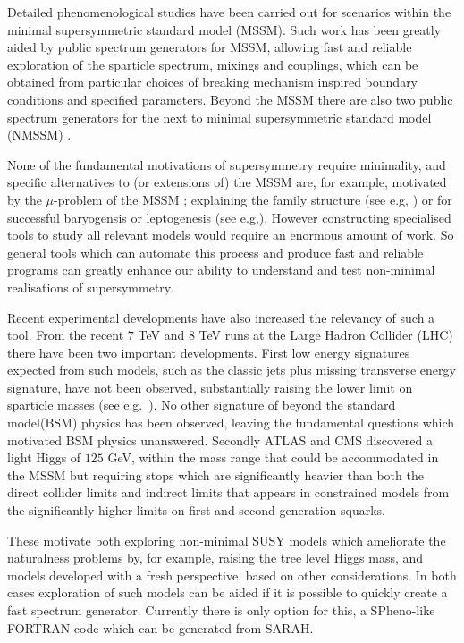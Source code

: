 \documentclass[final,3p,11pt,pdflatex]{elsarticle}
\newcommand{\sarah}{SARAH\xspace}
\begin{document}
Detailed phenomenological studies have been carried out for scenarios
within the minimal supersymmetric standard model (MSSM).  Such work
has been greatly aided by public spectrum generators for
MSSM\cite{Allanach:2001kg,Porod:2003um,Djouadi:2002ze,Baer:1993ae},
allowing fast and reliable exploration of the sparticle spectrum,
mixings and couplings, which can be obtained from particular choices
of breaking mechanism inspired boundary conditions and specified
parameters. Beyond the MSSM there are also two public spectrum
generators \cite{Ellwanger:2006rn,Allanach:2013kza} for the next to
minimal supersymmetric standard model (NMSSM) \cite{NMSSM}.

None of the fundamental motivations of supersymmetry require
minimality, and specific alternatives to (or extensions of) the MSSM
are, for example, motivated by the $\mu$-problem of the
MSSM \cite{Kim:1983dt}; explaining the family structure (see e.g,
\cite{King:2014nza}) or for successful baryogensis or leptogenesis
(see e.g,\cite{King:2008qb}). However constructing specialised tools
to study all relevant models would require an enormous amount of work.
So general tools which can automate this process and produce fast and
reliable programs can greatly enhance our ability to understand and
test non-minimal realisations of supersymmetry.

Recent experimental developments have also increased the relevancy of
such a tool. From the recent $7$ TeV and $8$ TeV runs at the Large
Hadron Collider (LHC) there have been two important developments.
First low energy signatures expected from such models, such as the
classic jets plus missing transverse energy signature, have not been
observed, substantially raising the lower limit on sparticle masses
(see e.g.~\cite{Aad:2013wta,Chatrchyan:2014lfa}). No other signature
of beyond the standard model(BSM) physics has been observed, leaving
the fundamental questions which motivated BSM physics
unanswered. Secondly ATLAS and CMS discovered\cite{ATLAS:2012ae,
  Chatrchyan:2012tx} a light Higgs of $125$ GeV, within the mass range
that could be accommodated in the MSSM but requiring stops which are
significantly heavier than both the direct collider limits and
indirect limits that appears in constrained models from the
significantly higher limits on first and second generation squarks.

These motivate both exploring non-minimal SUSY models which ameliorate
the naturalness problems by, for example, raising the tree level Higgs
mass, and models developed with a fresh perspective, based on other
considerations.  In both cases exploration of such models can be aided
if it is possible to quickly create a fast spectrum generator.
Currently there is only option for this, a SPheno-like FORTRAN code
which can be generated from
\sarah\cite{Staub:2010ty,Staub:2009bi,Staub:2010jh,Staub:2012pb,Staub:2013tta}.
\end{document}
